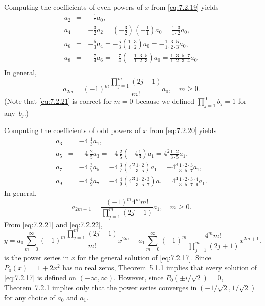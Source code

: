 \begin{examplesolution}
Computing the coefficients of even powers of $x$ from \eqref{eq:7.2.19} yields
\begin{eqnarray*}
  a_{2}&=&-\frac{1}{1}a_{0},\\[5pt] a_{4}&=&-\frac{3}{2}a_{2}=\left(-\frac{3}{2}\right)\left(-\frac{1}{1}\right)a_{0} =\frac{1\cdot3}{1\cdot2}a_{0}, \\[5pt]a_{6}&=&-\frac{5}{3}a_{4}= -\frac{5}{3}\left(\frac{1\cdot3}{1\cdot2}\right)a_{0} =-\frac{1\cdot3\cdot5}{1\cdot2\cdot3}a_{0},\\[5pt] a_{8}&=&-\frac{7}{4}a_{6}=-\frac{7}{4} \left(-\frac{1\cdot3\cdot5}{1\cdot2\cdot3}\right)a_{0}= \frac{1\cdot3\cdot5\cdot7}{1\cdot2\cdot3\cdot4}a_{0}.\\
\end{eqnarray*}
In general,
\begin{equation}
  \label{eq:7.2.21}a_{2m}=(-1)^{m}\frac{\prod_{j=1}^{m}(2j-1)}{m!}a_{0},\quad m\ge0.
\end{equation}
(Note that \eqref{eq:7.2.21} is correct for $m=0$ because we defined $\prod_{j=1}^{0}b_{j}=1$ for
any~$b_{j}$.)

Computing the coefficients of odd powers of $x$ from \eqref{eq:7.2.20} yields
\begin{eqnarray*}
  a_{3} & = & -4\,\frac{1}{3}a_{1},                                                                                                              \\[5pt]
  a_{5} & = & -4\,\frac{2}{5}a_{3}=-4\,\frac{2}{5}\left(-4{\frac{1}{3}}\right)a_{1}=4^{2}\frac{1\cdot2}{3\cdot5}a_{1},                           \\[5pt]
  a_{7} & = & -4\,\frac{3}{7}a_{5}=-4\,\frac{3}{7}\left(4^{2}\frac{1\cdot2}{3\cdot5}\right)a_{1}=-4^{3}\frac{1\cdot2\cdot3}{3\cdot5\cdot7}a_{1}, \\[5pt]
  a_{9} & = & -4\,\frac{4}{9}a_{7}=-4\,\frac{4}{9}\left(4^{3}\frac{1\cdot2\cdot3}{3\cdot5\cdot7}\right)a_{1}=4^{4}\frac{1\cdot2\cdot3\cdot4}{3\cdot5\cdot7\cdot9}a_{1}.
\end{eqnarray*}
In general,
\begin{equation}
  \label{eq:7.2.22}a_{2m+1}=\frac{(-1)^{m}4^{m}m!}{\prod_{j=1}^{m}(2j+1)}a_{1},\quad m\ge0.
\end{equation}
From \eqref{eq:7.2.21} and \eqref{eq:7.2.22},
\[
  y=a_{0}\sum^{\infty}_{m=0}(-1)^{m}\frac{\prod_{j=1}^{m}(2j-1)}{m!}x^{2m}+a_{1}\sum^{\infty}_{m=0}(-1)^{m}\frac{4^{m}m!}{\prod_{j=1}^{m}(2j+1)}x^{2m+1}.
\]
is the power series in $x$ for the general solution of \eqref{eq:7.2.17}. Since $P_{0}(x)=1+2x^{2}$
has no real zeros, Theorem~5.1.1 implies that every solution of \eqref{eq:7.2.17} is
defined on $(-\infty,\infty)$. However, since $P_{0}(\pm i/\sqrt{2})=0$, Theorem~7.2.1
implies only that the power series converges in $(-1/\sqrt{2},1/\sqrt{2})$ for any choice of $a_{0}$
and $a_{1}$.
\end{examplesolution}

